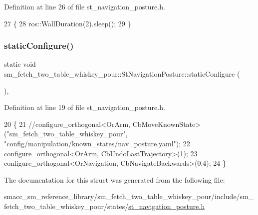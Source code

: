 Definition at line 26 of file st\+\_\+navigation\+\_\+posture.\+h.


\begin{DoxyCode}
27         \{
28             ros::WallDuration(2).sleep();
29         \}
\end{DoxyCode}
\mbox{\label{structsm__fetch__two__table__whiskey__pour_1_1StNavigationPosture_ab38848201a365bd32d6e0f3648d32e10}} 
\subsubsection{\texorpdfstring{static\+Configure()}{staticConfigure()}}
{\footnotesize\ttfamily static void sm\+\_\+fetch\+\_\+two\+\_\+table\+\_\+whiskey\+\_\+pour\+::\+St\+Navigation\+Posture\+::static\+Configure (\begin{DoxyParamCaption}{ }\end{DoxyParamCaption})\hspace{0.3cm}{\ttfamily [inline]}, {\ttfamily [static]}}



Definition at line 19 of file st\+\_\+navigation\+\_\+posture.\+h.


\begin{DoxyCode}
20         \{
21             \textcolor{comment}{//configure\_orthogonal<OrArm, CbMoveKnownState>("sm\_fetch\_two\_table\_whiskey\_pour",
       "config/manipulation/known\_states/nav\_posture.yaml");}
22             configure\_orthogonal<OrArm, CbUndoLastTrajectory>(1);
23             configure\_orthogonal<OrNavigation, CbNavigateBackwards>(0.4);
24         \}
\end{DoxyCode}


The documentation for this struct was generated from the following file\+:\begin{DoxyCompactItemize}
\item 
smacc\+\_\+sm\+\_\+reference\+\_\+library/sm\+\_\+fetch\+\_\+two\+\_\+table\+\_\+whiskey\+\_\+pour/include/sm\+\_\+fetch\+\_\+two\+\_\+table\+\_\+whiskey\+\_\+pour/states/\hyperlink{sm__fetch__two__table__whiskey__pour_2include_2sm__fetch__two__table__whiskey__pour_2states_2st__navigation__posture_8h}{st\+\_\+navigation\+\_\+posture.\+h}\end{DoxyCompactItemize}
